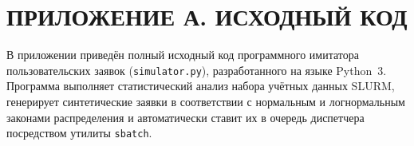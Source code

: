 %

\newpage
\section*{ПРИЛОЖЕНИЕ А. ИСХОДНЫЙ КОД}
\renewcommand{\thesection}{А}

В приложении приведён полный исходный код программного имитатора
пользовательских заявок (\texttt{simulator.py}), разработанного на языке
Python~3. Программа выполняет статистический анализ набора учётных
данных SLURM, генерирует синтетические заявки в соответствии с
нормальным и логнормальным законами распределения и автоматически
ставит их в очередь диспетчера посредством утилиты \texttt{sbatch}.

